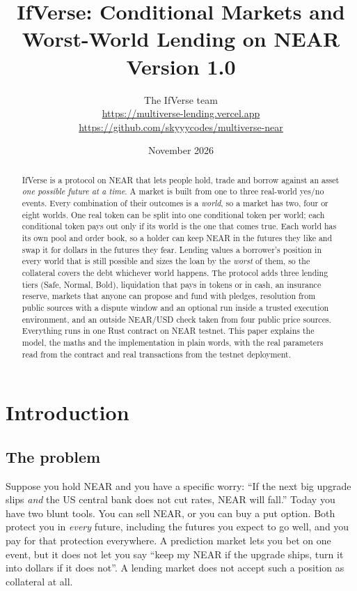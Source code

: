 \documentclass[11pt,a4paper]{article}
\title{\vspace{-1.5em}\textbf{IfVerse: Conditional Markets and Worst-World Lending on NEAR}\\[0.4em]
\large Version 1.0}
\author{The IfVerse team\\[0.3em]
\small \url{https://multiverse-lending.vercel.app}\\
\small \url{https://github.com/skyyycodes/multiverse-near}}
\date{November 2026}
\begin{document}
\maketitle
\thispagestyle{fancy}

\begin{abstract}
\noindent
IfVerse is a protocol on NEAR that lets people hold, trade and borrow against an asset \emph{one possible future at
a time}. A market is built from one to three real-world yes/no events. Every combination of their outcomes is a
\emph{world}, so a market has two, four or eight worlds. One real token can be split into one conditional token per
world; each conditional token pays out only if its world is the one that comes true. Each world has its own pool
and order book, so a holder can keep NEAR in the futures they like and swap it for dollars in the futures they fear.
Lending values a borrower's position in every world that is still possible and sizes the loan by the
\emph{worst} of them, so the collateral covers the debt whichever world happens. The protocol adds three lending
tiers (Safe, Normal, Bold), liquidation that pays in tokens or in cash, an insurance reserve, markets that anyone
can propose and fund with pledges, resolution from public sources with a dispute window and an optional run inside
a trusted execution environment, and an outside NEAR/USD check taken from four public price sources. Everything runs in one
Rust contract on NEAR testnet. This paper explains the model, the maths and the implementation in plain words, with
the real parameters read from the contract and real transactions from the testnet deployment.
\end{abstract}

\setcounter{tocdepth}{1}
\tableofcontents
\vspace{0.5em}

\section{Introduction}
\label{sec:intro}

\subsection{The problem}

Suppose you hold NEAR and you have a specific worry: ``If the next big upgrade slips \emph{and} the US central bank
does not cut rates, NEAR will fall.'' Today you have two blunt tools. You can sell NEAR, or you can buy a put option.
Both protect you in \emph{every} future, including the futures you expect to go well, and you pay for that
protection everywhere. A prediction market lets you bet on one event, but it does not let you say ``keep my NEAR if
the upgrade ships, turn it into dollars if it does not''. A lending market does not accept such a position as
collateral at all.
\end{document}
